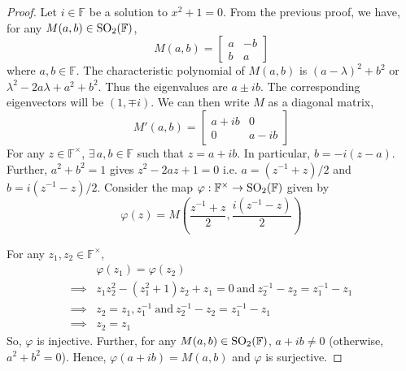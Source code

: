 \begin{proof}
    Let $i\in\mathbb{F}$ be a solution to $x^2+1=0$. From the previous proof, we
    have, for any $M(a,b)\in\mathrm{SO}_{2}(\mathbb{F})$,
    \[ M(a,b)=\begin{bmatrix}a & -b \\ b & a\end{bmatrix} \]
    where $a,b\in\mathbb{F}$. The characteristic polynomial of $M(a,b)$ is
    $(a-\lambda)^2+b^2$ or $\lambda^2 - 2 a \lambda + a^2 + b^2$. Thus the
    eigenvalues are $a \pm ib$. The corresponding eigenvectors will be
    $(1,\mp i)$. We can then write $M$ as a diagonal matrix,
    \[ M'(a,b)=\begin{bmatrix}a+ib & 0 \\ 0 & a-ib\end{bmatrix} \]
    For any $z\in\mathbb{F}^\times$, $\exists\,a,b\in\mathbb{F}$ such that
    $z=a+ib$. In particular, $b=-i(z-a)$. Further, $a^2+b^2=1$ gives $z^2-2az+1=0$
    i.e. $a=(z^{-1}+z)/2$ and $b=i(z^{-1}-z)/2$. Consider the map
    $\varphi : \mathbb{F}^\times \to \mathrm{SO}_{2}(\mathbb{F})$ given by
    \[ \varphi(z)=M\left(\frac{z^{-1}+z}{2},\frac{i(z^{-1}-z)}{2}\right) \]
    \vspace{1ex}

    \noindent
    For any $z_1,z_2\in\mathbb{F}^\times$,
    \begin{align*}
        & \varphi(z_1)=\varphi(z_2) \\
        \implies& z_1 z_2^2 - (z_1^2+1)z_2 + z_1 = 0\ \mathrm{and}\ z_2^{-1} - z_2 = z_1^{-1} - z_1 \\
        \implies& z_2 = z_1,z_1^{-1}\ \mathrm{and}\ z_2^{-1} - z_2 = z_1^{-1} - z_1 \\
        \implies& z_2 = z_1
    \end{align*}
    So, $\varphi$ is injective. Further, for any $M(a,b)\in\mathrm{SO}_{2}(\mathbb{F})$,
    $a+ib \neq 0$ (otherwise, $a^2+b^2=0$). Hence, $\varphi(a+ib)=M(a,b)$ and
    $\varphi$ is surjective.
    \vspace{1ex}


\end{proof}
